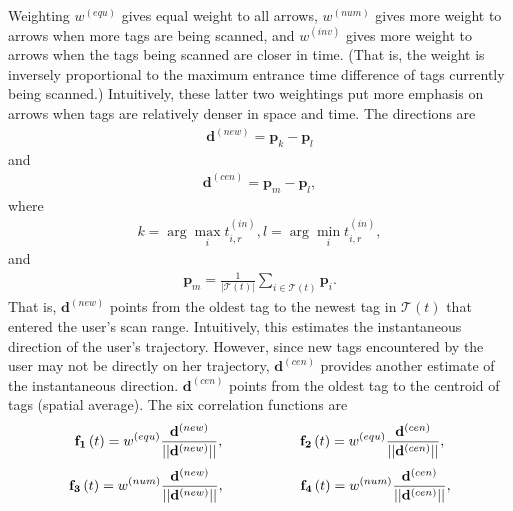 Weighting $w^{\left(equ\right)}$ gives equal weight to all arrows, $w^{\left(num\right)}$ gives more weight to arrows when more tags are being scanned, and $w^{\left(inv\right)}$ gives more weight to arrows when the tags being scanned are closer in time.  (That is, the weight is inversely proportional to the maximum entrance time difference of tags currently being scanned.)  Intuitively, these latter two weightings put more emphasis on arrows when tags are relatively denser in space and time.  The directions are
\begin{eqnarray}
\mathbf{d}^{\left(new\right)} =  \mathbf{p}_k - \mathbf{p}_l
\end{eqnarray}
and
\begin{eqnarray}
\mathbf{d}^{\left(cen\right)} = \mathbf{p}_m - \mathbf{p}_l, 
\end{eqnarray}
where
\begin{eqnarray}
k = \arg \max_i t^{\left( in \right)}_{i,r}, l = \arg \min_i t^{\left( in \right)}_{i,r},
\end{eqnarray}
and
\begin{eqnarray}
\mathbf{p}_m = \frac{1}{\left| \mathcal{T}\left(t\right) \right|}\sum_{i \in \mathcal{T}\left(t\right)} \mathbf{p}_i.
 \end{eqnarray}
That is, $\mathbf{d}^{\left(new\right)}$ points from the oldest tag to the newest tag in $\mathcal{T}\left(t\right)$ that entered the user's scan range.  Intuitively, this estimates the instantaneous direction of the user's trajectory.  However, since new tags encountered by the user may not be directly on her trajectory, $\mathbf{d}^{\left(cen\right)}$ provides another estimate of the instantaneous direction.  $\mathbf{d}^{\left(cen\right)}$ points from the oldest tag to the centroid of tags (spatial average).  The six correlation functions are
\begin{eqnarray}
\mathbf{f_1}\left(t\right) = w^{\left(equ\right)} \frac{\mathbf{d}^{\left(new\right)}}{|| \mathbf{d}^{\left(new\right)}  ||},
\hspace{0.75in} 
\mathbf{f_2}\left(t\right) = w^{\left(equ\right)} \frac{\mathbf{d}^{\left(cen\right)}}{|| \mathbf{d}^{\left(cen\right)}  ||}, 
\end{eqnarray}
\begin{eqnarray}
\mathbf{f_3}\left(t\right) = w^{\left(num\right)} \frac{\mathbf{d}^{\left(new\right)}}{|| \mathbf{d}^{\left(new\right)}  ||},
\hspace{0.75in} 
\mathbf{f_4}\left(t\right) = w^{\left(num\right)} \frac{\mathbf{d}^{\left(cen\right)}}{|| \mathbf{d}^{\left(cen\right)}  ||}, 
\end{eqnarray}
